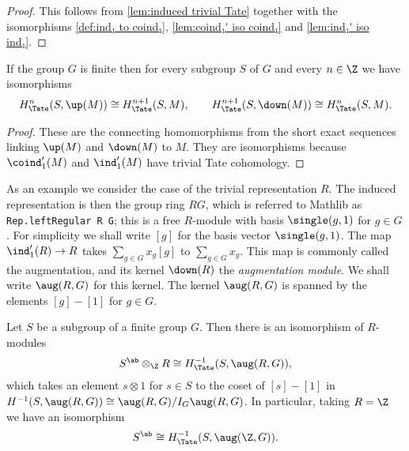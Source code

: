 \begin{proof}
	\leanok

	This follows from \ref{lem:induced trivial Tate}
	together with the isomorphisms \ref{def:ind₁ to coind₁},
	\ref{lem:coind₁' iso coind₁} and \ref{lem:ind₁' iso ind₁}.
\end{proof}

\begin{corollary}	\label{cor:Tate up down isos}
	\leanok
	If the group $G$ is finite then for every subgroup $S$ of $G$
	and every $n \in \Z$ we have isomorphisms
	\[
		H^n_{\Tate}(S, \up(M)) \cong H^{n+1}_{\Tate}(S,M),
		\qquad
		H^{n+1}_{\Tate}(S, \down(M)) \cong H^{n}_{\Tate}(S,M).
	\]
\end{corollary}

\begin{proof}
	These are the connecting homomorphisms from the
	short exact sequences linking $\up(M)$ and $\down(M)$ to $M$.
	They are isomorphisms because $\coind_1'(M)$ and $\ind_1'(M)$ have trivial Tate cohomology.
\end{proof}

\begin{definition} \label{def:augmentation module}
	\leanok
	As an example we consider the case of the trivial representation $R$.
	The induced representation is then the group ring $RG$, which is referred to
	Mathlib as \verb|Rep.leftRegular R G|; this is a free $R$-module with basis
	$\single(g,1)$ for $g \in G$.
	For simplicity we shall write $[g]$ for the basis vector $\single(g,1)$.
	The map $\ind_1'(R) \to R$ takes $\sum_{g\in G} x_g [g]$ to $\sum_{g \in G} x_g$.
	This map is commonly called the augmentation, and its kernel $\down(R)$ the
	\emph{augmentation module}.
	We shall write $\aug(R,G)$ for this kernel.
	The kernel $\aug(R,G)$ is spanned by the elements $[g]-[1]$ for $g \in G$.
\end{definition}

\begin{lemma} \label{lem:Tate -1 aug}
	Let $S$ be a subgroup of a finite group $G$.
	Then there is an isomorphism of $R$-modules
	\[
		S^{\ab} \otimes_{\Z} R \cong H^{-1}_{\Tate}(S,\aug(R,G)),
	\]
	which takes an element $s \otimes 1$ for $s \in S$ to the coset of $[s]-[1]$
	in $H^{-1}(S,\aug(R,G)) \cong \aug(R,G) / I_G \aug(R,G)$.
	In particular, taking $R = \Z$ we have an isomorphism
	\[
		S^{\ab} \cong H^{-1}_{\Tate}(S,\aug(\Z,G)).
	\]
\end{lemma}

